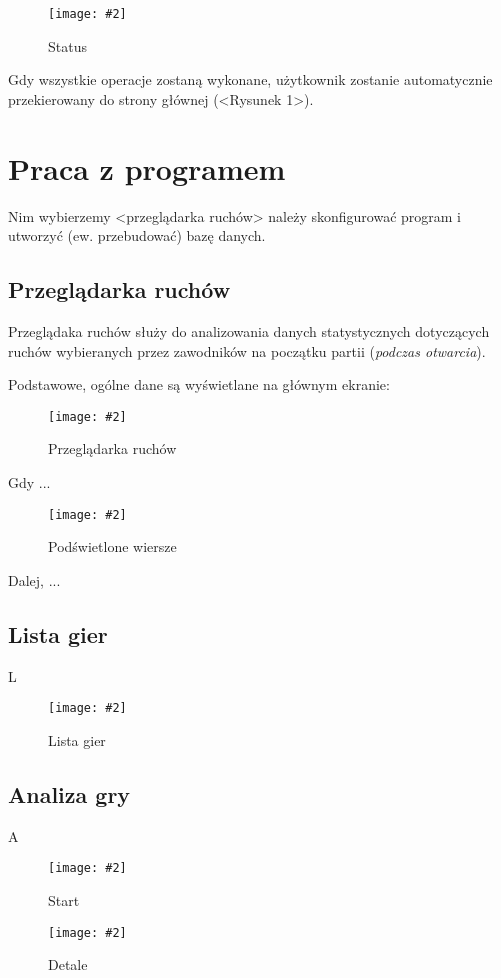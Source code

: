 \documentclass[10pt,leqno]{article}
\newcommand{\myimage}[3]{
  \begin{figure}[h!]
    \centering
      \texttt{[image: \#2]}
  \caption{#3}
  \end{figure}
}
\begin{document}
\myimage{0.4}{status.png}{Status}

Gdy wszystkie operacje zostaną wykonane, użytkownik zostanie automatycznie przekierowany do strony głównej (<Rysunek 1>).

\newpage

\section{Praca z programem}
Nim wybierzemy <przeglądarka ruchów> należy skonfigurować program i utworzyć (ew. przebudować) bazę danych.

\subsection{Przeglądarka ruchów}

Przeglądaka ruchów służy do analizowania danych statystycznych dotyczących ruchów wybieranych przez zawodników na początku partii (\emph{podczas otwarcia}).

Podstawowe, ogólne dane są wyświetlane na głównym ekranie:

\myimage{0.47}{moveBrowserMain.png}{Przeglądarka ruchów}

Gdy ...

\myimage{0.47}{moveBrowserMoveOver.png}{Podświetlone wiersze}

\newpage

Dalej, ...

\subsection{Lista gier}
L

\myimage{0.47}{gameList.png}{Lista gier}

\subsection{Analiza gry}
A

\myimage{0.47}{gameDetailsMain.png}{Start}

\myimage{0.47}{gameDetails.png}{Detale}

\end{document}
